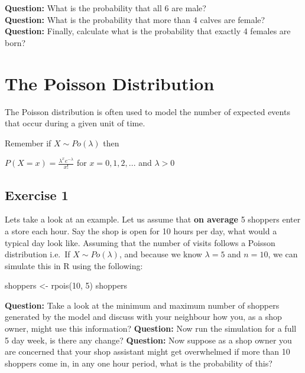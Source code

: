 \documentclass[
  10pt,
  letterpaper,
  DIV=11,
  numbers=noendperiod]{scrartcl}
\newenvironment{Shaded}{\begin{snugshade}}{\end{snugshade}}
\newcommand{\DecValTok}[1]{\textcolor[rgb]{0.68,0.00,0.00}{#1}}
\newcommand{\FunctionTok}[1]{\textcolor[rgb]{0.28,0.35,0.67}{#1}}
\newcommand{\NormalTok}[1]{\textcolor[rgb]{0.00,0.23,0.31}{#1}}
\newcommand{\OtherTok}[1]{\textcolor[rgb]{0.00,0.23,0.31}{#1}}
\begin{document}
\textbf{Question:} What is the probability that all 6 are male?\\
\textbf{Question:} What is the probability that more than 4 calves are
female?\\
\textbf{Question:} Finally, calculate what is the probability that
exactly 4 females are born?\\

\section{The Poisson Distribution}\label{the-poisson-distribution}

The Poisson distribution is often used to model the number of expected
events that occur during a given unit of time.

Remember if \(X \sim Po(\lambda)\) then

\(P(X=x)=\frac{\lambda^xe^{-\lambda}}{x!}\) for \(x = 0,1,2,...\) and
\(\lambda>0\)

\subsection{Exercise 1}\label{exercise-1-1}

Lets take a look at an example. Let us assume that \textbf{on average} 5
shoppers enter a store each hour. Say the shop is open for 10 hours per
day, what would a typical day look like. Assuming that the number of
visits follows a Poisson distribution i.e.~If \(X \sim Po(\lambda)\),
and because we know \(\lambda=5\) and \(n=10\), we can simulate this in
R using the following:

\begin{Shaded}
\begin{Highlighting}[]
\NormalTok{shoppers }\OtherTok{\textless{}{-}} \FunctionTok{rpois}\NormalTok{(}\DecValTok{10}\NormalTok{, }\DecValTok{5}\NormalTok{)}
\NormalTok{shoppers}
\end{Highlighting}
\end{Shaded}

\textbf{Question:} Take a look at the minimum and maximum number of
shoppers generated by the model and discuss with your neighbour how you,
as a shop owner, might use this information? \textbf{Question:} Now run
the simulation for a full 5 day week, is there any change?
\textbf{Question:} Now suppose as a shop owner you are concerned that
your shop assistant might get overwhelmed if more than 10 shoppers come
in, in any one hour period, what is the probability of this?
\end{document}
